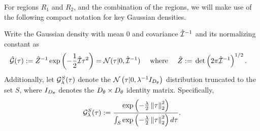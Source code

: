 
For regions $R_1$ and $R_2$, and the combination of the regions, we will make
use of the following compact notation for key Gaussian densities.

\begin{defn}

Write the Gaussian density with mean $0$  and covariance $\hat{\mathcal{I}}^{-1}$
and its normalizing constant as
\begin{align*}
\hat{\mathcal{G}}(\tau) :={}&
    \hat{Z}^{-1} \exp\left(-\frac{1}{2} \hat{\mathcal{I}} \tau^2 \right)
    = \mathcal{N}(\tau \vert 0, \hat{\mathcal{I}}^{-1}) \quad\textrm{ where }\quad
\hat{Z} :={} \det\left(2\pi \hat{\mathcal{I}}^{-1} \right)^{1/2}.
\end{align*}
%
Additionally,
let $\mathcal{G}_{\lambda}^{S}(\tau)$ denote the $\mathcal{N}\left(\tau | 0,
\lambda^{-1} I_{D_\theta} \right)$ distribution truncated to the set $S$,
where $I_{D_\theta}$ denotes the $D_\theta \times D_\theta$ identity matrix.
Specifically,
%
\begin{align*}
%
\normresid{\lambda}{S}(\tau) :=
\frac{
    \exp\left( - \frac{\lambda}{2} \norm{\tau}_2^2 \right)
}{
    \int_{S}
        \exp\left( - \frac{\lambda}{2} \norm{\tau}_2^2 \right) d\tau
}.
%
\end{align*}
%
\end{defn}
